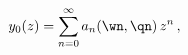 \begin{equation}
y_0 (z) = \sum\limits_{n=0}^{\infty} a_n (\wn,\qn)\, z^n\,,
\label{frobeniuszero}
\end{equation}

